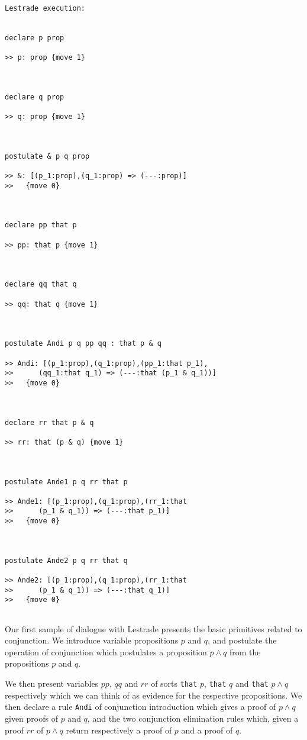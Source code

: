 \documentclass[12pt]{article}
\begin{document}
\begin{verbatim}Lestrade execution:


declare p prop

>> p: prop {move 1}



declare q prop

>> q: prop {move 1}



postulate & p q prop

>> &: [(p_1:prop),(q_1:prop) => (---:prop)]
>>   {move 0}



declare pp that p

>> pp: that p {move 1}



declare qq that q

>> qq: that q {move 1}



postulate Andi p q pp qq : that p & q

>> Andi: [(p_1:prop),(q_1:prop),(pp_1:that p_1),
>>      (qq_1:that q_1) => (---:that (p_1 & q_1))]
>>   {move 0}



declare rr that p & q

>> rr: that (p & q) {move 1}



postulate Ande1 p q rr that p

>> Ande1: [(p_1:prop),(q_1:prop),(rr_1:that
>>      (p_1 & q_1)) => (---:that p_1)]
>>   {move 0}



postulate Ande2 p q rr that q

>> Ande2: [(p_1:prop),(q_1:prop),(rr_1:that
>>      (p_1 & q_1)) => (---:that q_1)]
>>   {move 0}


\end{verbatim}

Our first sample of dialogue with Lestrade presents the basic primitives related to conjunction.  We introduce variable propositions $p$ and $q$, and postulate the operation of conjunction which postulates a proposition $p \wedge q$ from the propositions $p$ and $q$.

We then present variables $pp$, $qq$ and $rr$ of sorts {\tt that} $p$, {\tt that} $q$ and {\tt that} $p \wedge q$ respectively which we can think of as evidence for the respective propositions.   We then declare a rule {\tt Andi} of conjunction introduction which gives a proof of $p \wedge q$ given proofs of $p$ and $q$, and the two conjunction elimination rules which, given a proof $rr$ of $p \wedge q$ return respectively a proof of $p$ and a proof of $q$.
\end{document}
